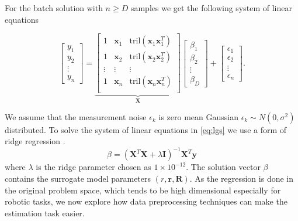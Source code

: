 For the batch solution with $n \geq D$ samples
we get the following system of linear equations

\begin{equation}
  \label{eq:lgs}
\begin{bmatrix} y_1 \\ y_2 \\ \vdots \\ y_n \end{bmatrix}
=
\underbrace{
\begin{bmatrix}
  1 & \mathbf{x}_1 & \text{tril}(\mathbf{x}_1 \mathbf{x}_1^T) \\
  1 & \mathbf{x}_2 & \text{tril}(\mathbf{x}_2 \mathbf{x}_2^T) \\
  \vdots & \vdots & \vdots \\
  1 & \mathbf{x}_n & \text{tril}(\mathbf{x}_n \mathbf{x}_n^T) \\
\end{bmatrix}}_{\mathbf{X}}
\begin{bmatrix}
  \beta_1 \\ \beta_2 \\ \vdots \\ \beta_D
\end{bmatrix}
+
\begin{bmatrix}
  \epsilon_1 \\
  \epsilon_2 \\
  \vdots \\
  \epsilon_n
\end{bmatrix}.
\end{equation}


We assume that the measurement noise $\epsilon_k$ is zero mean Gaussian
$\epsilon_k \sim N(0, \sigma^2)$ distributed.
To solve the system of linear equations in \ref{eq:lgs} we use
a form of ridge regression \citep{hoerl1975ridge}.
$$ \beta = (\mathbf{X}^T \mathbf{X} +
\lambda \mathbf{I})^{-1} \mathbf{X}^T \mathbf{y} $$
where $\lambda$ is the ridge parameter chosen as $1 \times 10^{-12}$.
The solution vector $\beta$ contains the surrogate model parameters
$(r, \mathbf{r}, \mathbf{R})$. As the regression is done
in the original problem space, which tends to be high dimensional especially
for robotic tasks, we now explore how data preprocessing techniques
can make the estimation task easier.


